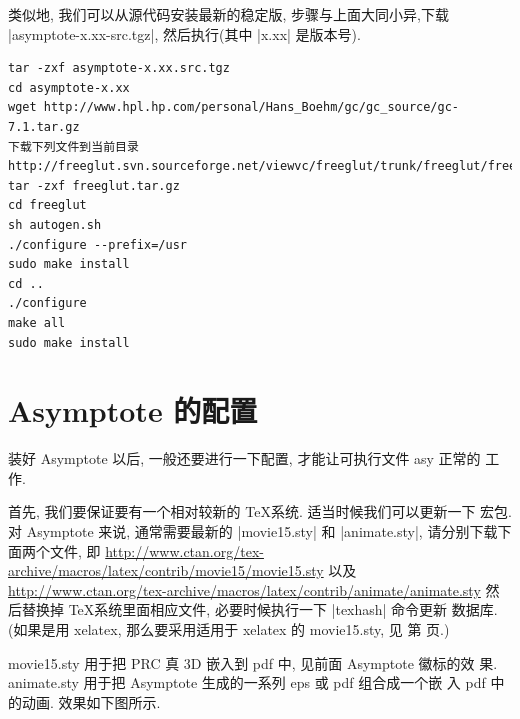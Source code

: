 \documentclass[nofonts,CJKnormalspaces]{ctexbook}[2009/05/20]
\begin{document}
类似地, 我们可以从源代码安装最新的稳定版, 步骤与上面大同小异,下载
|asymptote-x.xx-src.tgz|, 然后执行(其中 |x.xx| 是版本号).
\begin{verbatim}
tar -zxf asymptote-x.xx.src.tgz
cd asymptote-x.xx
wget http://www.hpl.hp.com/personal/Hans_Boehm/gc/gc_source/gc-7.1.tar.gz
下载下列文件到当前目录
http://freeglut.svn.sourceforge.net/viewvc/freeglut/trunk/freeglut/freeglut.tar.gz
tar -zxf freeglut.tar.gz
cd freeglut
sh autogen.sh
./configure --prefix=/usr
sudo make install
cd ..
./configure
make all
sudo make install
\end{verbatim}

\section{Asymptote 的配置}
装好 Asymptote 以后, 一般还要进行一下配置, 才能让可执行文件 asy 正常的
工作.\label{asy:Settings}

首先, 我们要保证要有一个相对较新的 \TeX 系统. 适当时候我们可以更新一下
宏包. 对 Asymptote 来说, 通常需要最新的 |movie15.sty| 和 |animate.sty|,
请分别下载下面两个文件, 即
\url{http://www.ctan.org/tex-archive/macros/latex/contrib/movie15/movie15.sty}
以及
\url{http://www.ctan.org/tex-archive/macros/latex/contrib/animate/animate.sty}
然后替换掉 \TeX 系统里面相应文件, 必要时候执行一下 |texhash| 命令更新
数据库.(如果是用 xelatex, 那么要采用适用于 xelatex 的 movie15.sty, 见
第 \pageref{movie15:xelatex} 页.)

movie15.sty 用于把 PRC 真 3D 嵌入到 pdf 中, 见前面 Asymptote 徽标的效
果. animate.sty 用于把 Asymptote 生成的一系列 eps 或 pdf 组合成一个嵌
入 pdf 中的动画. 效果如下图所示.
\end{document}
